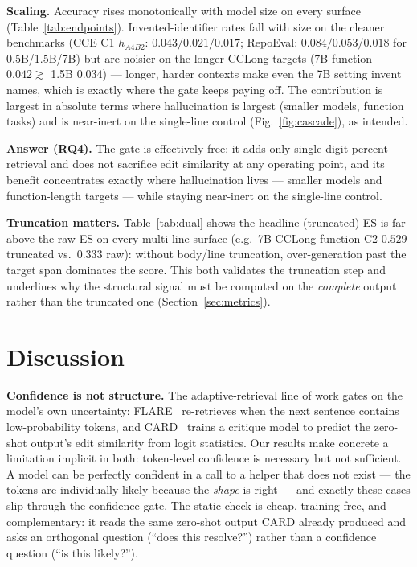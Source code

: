 \documentclass[10pt,conference]{IEEEtran}
\newcommand{\ugr}[1]{{\color{revgreen}#1}}
\newcommand{\sugg}[1]{{\color{suggviolet}#1}}
\begin{document}
\textbf{Scaling.} Accuracy rises monotonically with model size on every surface
(Table~\ref{tab:endpoints}). Invented-identifier rates fall with size on the
cleaner benchmarks (CCE C1 $h_{A4B2}$: $0.043/0.021/0.017$; RepoEval:
$0.084/0.053/0.018$ for 0.5B/1.5B/7B) but are noisier on the longer CCLong targets
(7B-function $0.042 \gtrsim$ 1.5B $0.034$) --- longer, harder contexts make even the
7B setting invent names, which is exactly where the gate keeps paying off. The contribution
is largest in absolute terms where hallucination is largest (smaller models,
function tasks) and is near-inert on the single-line control
(Fig.~\ref{fig:cascade}), as intended.

\sugg{\noindent\textbf{Answer (RQ4).} The gate is effectively free: it adds
only single-digit-percent retrieval and does not sacrifice edit similarity at
any operating point, and its benefit concentrates exactly
where hallucination lives --- smaller models and function-length targets ---
while staying near-inert on the single-line control.}

\textbf{Truncation matters.} Table~\ref{tab:dual} shows the headline (truncated)
ES is far above the raw ES on every multi-line surface \ugr{(e.g.\ 7B CCLong-function C2
$0.529$ truncated vs.\ $0.333$ raw)}: without body/line truncation, over-generation
past the target span dominates the score. This both validates the truncation step
and underlines why the structural signal must be computed on the \emph{complete}
output rather than the truncated one (Section~\ref{sec:metrics}).

\begin{table}[tb]
\caption{RQ4 --- truncated (headline) vs.\ raw edit similarity. Over-generation
past the target span heavily deflates the raw score on every multi-line surface,
justifying span truncation for accuracy (and on-complete scoring for hallucination).}
\label{tab:dual}
\centering\footnotesize

\end{table}

\section{Discussion}

\textbf{Confidence is not structure.} The adaptive-retrieval line of work gates on
the model's own uncertainty: FLARE~\cite{jiang2023flare} re-retrieves when the
next sentence contains low-probability tokens, and CARD~\cite{zhang2024card} trains
a critique model to predict the zero-shot output's edit similarity from logit
statistics. Our results make concrete a limitation implicit in both: token-level
confidence is necessary but not sufficient. A model can be perfectly confident in a
call to a helper that does not exist --- the tokens are individually likely because
the \emph{shape} is right --- and exactly these cases slip through the confidence
gate. The static check is cheap, training-free, and complementary: it reads the
same zero-shot output CARD already produced and asks an orthogonal question
(``does this resolve?'') rather than a confidence question (``is this likely?'').
\end{document}
